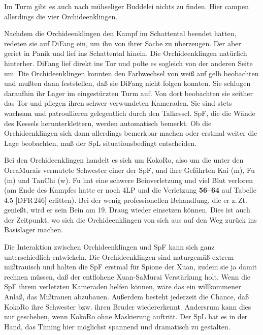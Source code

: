 \documentclass[
a4paper,
twoside,
DIV=calc,
BCOR=4mm,
fontsize=9pt,
twocolumn=on,
titlepage=on,
parskip=half
]{scrartcl}
\begin{document}

Im Turm gibt es auch nach mühseliger Buddelei nichts zu finden. Hier
campen allerdings die vier Orchideenklingen.

Nachdem die Orchideenklingen den Kampf im Schattental beendet hatten,
redeten sie auf DiFang ein, um ihn von ihrer Sache zu überzeugen. Der
aber geriet in Panik und lief ins Schattental hinein. Die
Orchideenklingen natürlich hinterher. DiFang lief direkt ins Tor und
polte es sogleich von der anderen Seite um. Die Orchideenklingen
konnten den Farbwechsel von weiß auf gelb beobachten und mußten dann
feststellen, daß sie DiFang nicht folgen konnten. Sie schlugen
daraufhin ihr Lager im eingestürzten Turm auf. Von dort beobachten sie
seither das Tor und pflegen ihren schwer verwundeten Kameraden. Sie
sind stets wachsam und patroullieren gelegentlich durch den
Talkessel. SpF, die die Wände des Kessels herunterklettern, werden
automatisch bemerkt. Ob die Orchideenklingen sich dann allerdings
bemerkbar machen oder erstmal weiter die Lage beobachten, muß der SpL
situationsbedingt entscheiden.

Bei den Orchideenklingen handelt es sich um KokoRo, also um die unter
den OrcaMurais vermutete Schwester einer der SpF, und ihre Gefährten
Kai (m), Fu (m) und TanChi (w). Fu hat eine schwere Beinverletzung und
viel Blut verloren (am Ende des Kampfes hatte er noch 4LP und die
Verletzung \textbf{56--64} auf Tabelle 4.5 [DFR\,246] erlitten). Bei
der wenig professionellen Behandlung, die er z.\,Zt. genießt, wird er
sein Bein am 19. Draug wieder einsetzen können. Dies ist auch der
Zeitpunkt, wo sich die Orchideenklingen von sich aus auf den Weg
zurück ins Basislager machen.

Die Interaktion zwischen Orchideenklingen und SpF kann sich ganz
unterschiedlich entwickeln. Die Orchideenklingen sind naturgemäß
extrem mißtrauisch und halten die SpF erstmal für Spione der Xuan,
zudem sie ja damit rechnen müssen, daß der entflohene Xuan-SaMurai
Verstärkung holt. Wenn die SpF ihrem verletzten Kameraden helfen
können, wäre das ein willkommener Anlaß, das Mißtrauen
abzubauen. Außerdem besteht jederzeit die Chance, daß KokoRo ihre
Schwester bzw. ihren Bruder wiedererkennt. Andersrum kann dies nur
geschehen, wenn KokoRo ohne Maskierung auftritt. Der SpL hat es in der
Hand, das Timing hier möglichst spannend und dramatisch zu gestalten.
\end{document}
